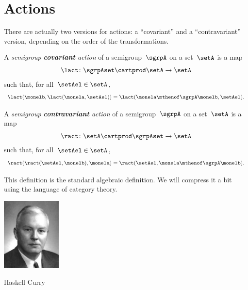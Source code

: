 
\section{Actions}
\label{sec:actions}

There are actually two versions for actions: a ``covariant'' and a ``contravariant'' version, depending on the order of the transformations.

\begin{ctdefinition}
    \label{def:semigroup-cov-action-prelim}
    A \emph{semigroup \textbf{covariant} action} of a semigroup~$\sgrpA$ on a set~$\setA$ is a map
    \begin{equation}
        \label{eq:lact}
        \lact \colon \sgrpAset \cartprod \setA \to \setA
    \end{equation}
    such that, for all~$\setAel \in \setA$,
    \begin{equation}
        \label{eq:lact1cond}
        \lact(\monelb, \lact(\monela, \setAel)) = \lact(\monela \mthenof\sgrpA \monelb, \setAel).
    \end{equation}
\end{ctdefinition}

\begin{ctdefinition}
    \label{def:semigroup-contra-action-prelim}
    A \emph{semigroup \textbf{contravariant} action} of a semigroup~$\sgrpA$ on a set~$\setA$ is a map
    \begin{equation}
        \label{eq:ract}
        \ract \colon \setA \cartprod \sgrpAset \to \setA
    \end{equation}
    such that, for all~$\setAel \in \setA$,
    \begin{equation}
        \label{eq:ract1cond}
        \ract(\ract(\setAel, \monelb), \monela) = \ract(\setAel, \monela \mthenof\sgrpA \monelb).
    \end{equation}
\end{ctdefinition}

This definition is the standard algebraic definition.
We will compress it a bit using the language of category theory.

\begin{marginfigure}
    \includegraphics[width=3cm]{../../../pics/haskell.jpg}
    \caption{Haskell Curry}
    \label{fig:haskell-curry}
\end{marginfigure}


